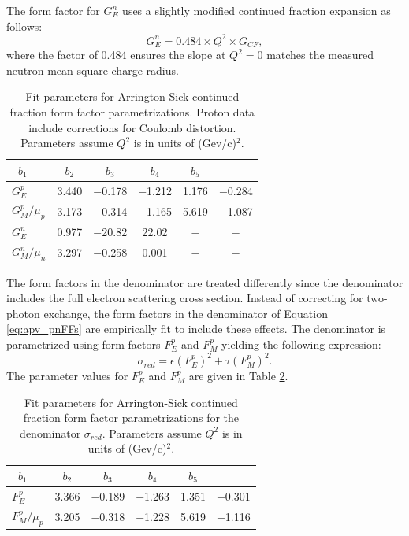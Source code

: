 The form factor for $G_E^n$ uses a slightly modified continued fraction expansion as follows:
\[
G_E^n = 0.484\times Q^2\times G_{CF},
\]
where the factor of 0.484 ensures the slope at $Q^2=0$ matches the measured neutron mean-square charge radius\cite{ArringtonSick}\cite{Koester}.
\begin{table}
\centering
\caption{\label{tab:AS_parameters}Fit parameters for Arrington-Sick continued fraction form factor parametrizations\cite{ArringtonSick}. Proton data include corrections for Coulomb distortion. Parameters assume $Q^2$ is in units of (Gev/c)$^2$.}
\begin{tabular}{lccccc}\hline
~$b_1$&$b_2$&$b_3$&$b_4$&$b_5$\\\hline
$G_E^p$&3.440&$-$0.178&$-$1.212&1.176&$-$0.284\\
$G_M^p/\mu_p$&3.173&$-$0.314&$-$1.165&5.619&$-$1.087\\
$G_E^n$&0.977&$-$20.82&22.02&$-$&$-$\\
$G_M^n/\mu_n$&3.297&$-$0.258&0.001&$-$&$-$\\\hline
\end{tabular}
\end{table}

The form factors in the denominator are treated differently since the denominator includes the full electron scattering cross section. Instead of correcting for two-photon exchange, the form factors in the denominator of Equation \ref{eq:apv_pnFFs} are empirically fit to include these effects. The denominator is parametrized using form factors $F_E^p$ and $F_M^p$ yielding the following expression:
\[
\sigma_{red}=\epsilon(F_E^p)^2+\tau (F_M^p)^2.
\] 
The parameter values for $F_E^p$ and $F_M^p$ are given in Table \ref{tab:AS_denom_parameters}.
\begin{table}
\centering
\caption{\label{tab:AS_denom_parameters}Fit parameters for Arrington-Sick continued fraction form factor parametrizations for the denominator $\sigma_{red}$\cite{ArringtonSick}. Parameters assume $Q^2$ is in units of (Gev/c)$^2$.}
\begin{tabular}{lccccc}\hline
~$b_1$&$b_2$&$b_3$&$b_4$&$b_5$\\\hline
$F_E^p$&3.366&$-$0.189&$-$1.263&1.351&$-$0.301\\
$F_M^p/\mu_p$&3.205&$-$0.318&$-$1.228&5.619&$-$1.116\\\hline
\end{tabular}
\end{table}

